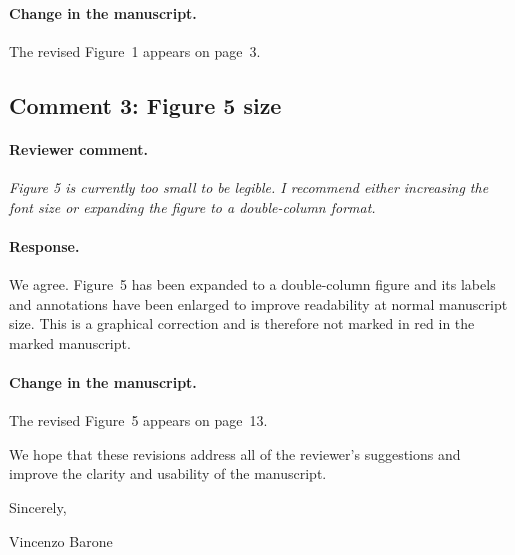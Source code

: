 \documentclass[11pt]{article}
\begin{document}
\paragraph{Change in the manuscript.}
The revised Figure~1 appears on page~3.

\subsection*{Comment 3: Figure 5 size}

\paragraph{Reviewer comment.}
\emph{Figure 5 is currently too small to be legible. I recommend either
increasing the font size or expanding the figure to a double-column format.}

\paragraph{Response.}
We agree. Figure~5 has been expanded to a double-column figure and its labels
and annotations have been enlarged to improve readability at normal manuscript
size. This is a graphical correction and is therefore not marked in red in the
marked manuscript.

\paragraph{Change in the manuscript.}
The revised Figure~5 appears on page~13.

We hope that these revisions address all of the reviewer's suggestions and
improve the clarity and usability of the manuscript.

Sincerely,

Vincenzo Barone
\end{document}
